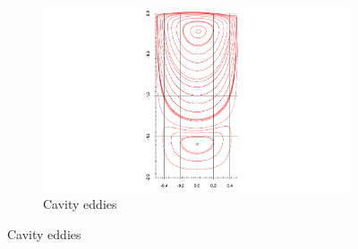\documentclass[twocolumn,10pt]{asme2ej}
\begin{document}
\clearpage
\begin{figure}[tbh]
        \centering
        \begin{subfigure}[b]{0.5\textwidth}
                \includegraphics[width=\textwidth]{figure/AR2-Re100 streamFunction axis final.pdf}
                \caption{Cavity eddies}
                \label{AR2RE100_cavity}
        \end{subfigure}%
        \label{AR2RE100}


\end{figure}
\end{document}
